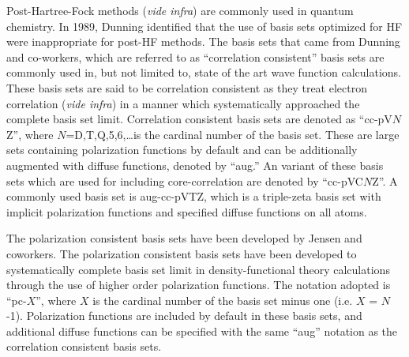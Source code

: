 \vspace{3mm}
\vspace{1mm}

Post-Hartree-Fock methods (\emph{vide infra}) are commonly used in quantum chemistry. In 1989, Dunning\cite{Dunning1989, Kendall1992, Woon1994} identified that the use of basis sets optimized for HF were inappropriate for post-HF methods. The basis sets that came from Dunning and co-workers, which are referred to as ``correlation consistent'' basis sets are commonly used in, but not limited to, state of the art wave function calculations. These basis sets are said to be correlation consistent as they treat electron correlation (\emph{vide infra}) in a manner which systematically approached the complete basis set limit. Correlation consistent basis sets are denoted as ``cc-pV$N$Z'', where $N$=D,T,Q,5,6,\ldots is the cardinal number of the basis set. These are large sets containing polarization functions by default and can be additionally augmented with diffuse functions, denoted by ``aug.'' An variant of these basis sets which are used for including core-correlation are denoted by ``cc-pVC$N$Z''.\cite{Peterson2002}
A commonly used basis set is aug-cc-pVTZ, which is a triple-zeta basis set with implicit polarization functions and specified diffuse functions on all atoms.

\vspace{3mm}
\vspace{1mm}

The polarization consistent basis sets have been developed by Jensen and coworkers.\cite{Jensen2001, Jensen2002, Jensen2002a, Jensen2003} The polarization consistent basis sets have been developed to systematically complete basis set limit in density-functional theory calculations through the use of higher order polarization functions. The notation adopted is ``pc-$X$'', where $X$ is the cardinal number of the basis set minus one (i.e. $X$ = $N$-1). Polarization functions are included by default in these basis sets, and additional diffuse functions can be specified with the same ``aug'' notation as the correlation consistent basis sets.

\vspace{3mm}
\vspace{1mm}

